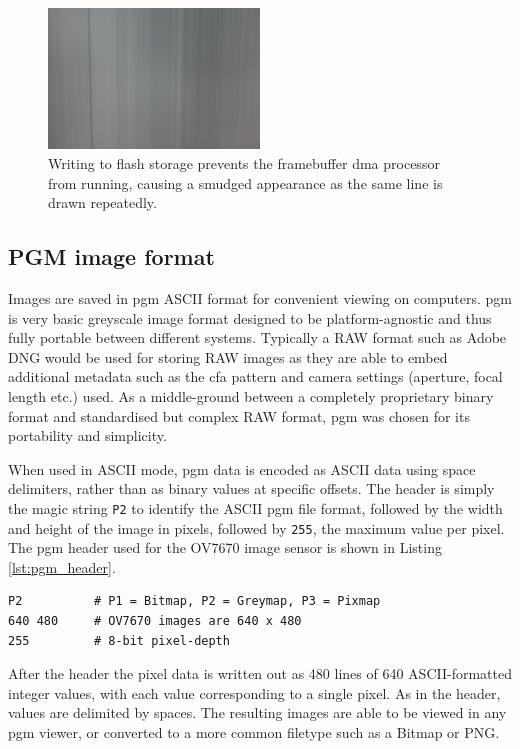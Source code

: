 \begin{figure}
  \centering
  \includegraphics[width=0.5\textwidth]{./img/interrupt_smudge.jpg}
  \caption[Video output smudge due to blocking.]{Writing to flash storage prevents the framebuffer \gls{dma} processor from running, causing a smudged appearance as the same line is drawn repeatedly.}
  \label{fig:interrupt_smudge}
\end{figure}

\subsection{PGM image format}
Images are saved in \gls{pgm} ASCII format for convenient viewing on computers. \gls{pgm} is very basic greyscale image format designed to be platform-agnostic and thus fully portable between different systems. Typically a RAW format such as Adobe DNG would be used for storing RAW images as they are able to embed additional metadata such as the \gls{cfa} pattern and camera settings (aperture, focal length etc.) used. As a middle-ground between a completely proprietary binary format and standardised but complex RAW format, \gls{pgm} was chosen for its portability and simplicity.

When used in ASCII mode, \gls{pgm} data is encoded as ASCII data using space delimiters, rather than as binary values at specific offsets. The header is simply the magic string \texttt{P2} to identify the ASCII \gls{pgm} file format, followed by the width and height of the image in pixels, followed by \texttt{255}, the maximum value per pixel. The \gls{pgm} header used for the OV7670 image sensor is shown in Listing \ref{lst:pgm_header}.

\begin{lstlisting}[caption={\gls{pgm} file header.}, label={lst:pgm_header}]
P2          # P1 = Bitmap, P2 = Greymap, P3 = Pixmap
640 480     # OV7670 images are 640 x 480
255         # 8-bit pixel-depth
\end{lstlisting}

After the header the pixel data is written out as 480 lines of 640 ASCII-formatted integer values, with each value corresponding to a single pixel. As in the header, values are delimited by spaces. The resulting images are able to be viewed in any \gls{pgm} viewer, or converted to a more common filetype such as a Bitmap or PNG.
